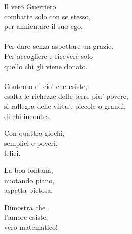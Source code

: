 \begin{haiku}
Il vero Guerriero\\
combatte solo con se stesso,\\
per annientare il suo ego.\\
\leavevmode\\
Per dare senza aspettare un grazie.\\
Per accogliere e ricevere solo\\
quello chi gli viene donato.\\
\leavevmode\\
Contento di cio' che esiste,\\
esalta le richezze delle terre piu' povere,\\
si rallegra delle virtu', piccole o grandi,\\
di chi incontra.\\
\end{haiku}

\begin{haiku}
Con quattro giochi,\\
semplici e poveri,\\
felici.\\
\end{haiku}

\begin{haiku}
La boa lontana,\\
nuotando piano,\\
aspetta pietosa.\\
\end{haiku}

\begin{haiku}
    Dimostra che\\
    l'amore esiste,\\
    vero matematico!\\
\end{haiku}

